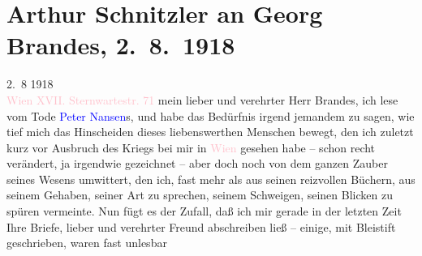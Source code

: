 

               \section[Arthur Schnitzler an Georg Brandes, 2. 8. 1918]{ Arthur Schnitzler an Georg Brandes, 2. 8. 1918}\nopagebreak{}\rehead{ }\normalsize\beginnumbering{} \toendnotes[C]{\smallbreak\pagebreak[2]} 
\toendnotes[C]{\smallbreak}\pstart
           \raggedleft{}{\pb}2. 8 1918{\\}\textcolor{pink}{Wien XVII. Sternwartestr. 71}{}\ledrightnote{\textcolor{pink}{Sternwartestraße}}\pend
           \pstart{}mein lieber und verehrter Herr Brandes,\pend\pstart
           ich lese vom Tode \textcolor{blue}{Peter Nansen}{}\ledrightnote{\textcolor{blue}{Peter Nansen}}s, und habe das
                    Bedürfnis irgend jemandem zu sagen, wie tief mich das Hinscheiden dieses
                    liebenswerthen Menschen bewegt, den ich zuletzt kurz vor Ausbruch des Kriegs bei
                    mir in \textcolor{pink}{Wien}{}\ledrightnote{\textcolor{pink}{Wien}} gesehen habe – schon recht verändert, ja irgendwie gezeichnet – aber
                    doch noch von dem ganzen Zauber seines Wesens umwittert, den ich, fast mehr als
                    aus seinen reizvollen Büchern, aus seinem Gehaben, seiner Art zu sprechen,
                    seinem Schweigen, seinen Blicken zu spüren vermeinte. Nun fügt es der Zufall,
                    daß ich mir gerade in der letzten Zeit Ihre Briefe, lieber und verehrter Freund
                    abschreiben ließ – einige, mit Bleistift geschrieben, waren fast unlesbar
